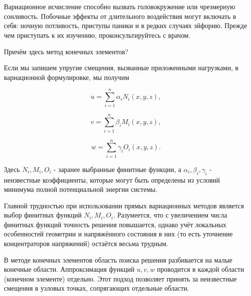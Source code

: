 \documentclass{article}
\begin{document}
\newpage
\section{}\label{appendix_d}

\begin{warn}[ВНИМАНИЕ!]
	Вариационное исчисление способно вызвать головокружение или чрезмерную сонливость. Побочные эффекты от длительного воздействия могут включать в себя: ночную потливость, приступы паники и в редких случаях эйфорию. Прежде чем приступать к их изучению, проконсультируйтесь с врачом.
\end{warn}

\begin{question}
	Причём здесь метод конечных элементов?
\end{question}

Если мы запишем упругие смещения, вызванные приложенными нагрузками, в вариационной формулировке, мы получим

\begin{displaymath}
	u = \sum_{i=1}^n  \alpha_{i} N_{i}(x, y, z),
\end{displaymath}

\begin{displaymath}
	v = \sum_{i=1}^n  \beta_{i} M_{i}(x, y, z),
\end{displaymath}

\begin{displaymath}
	w = \sum_{i=1}^n  \gamma_{i} O_{i}(x, y, z).
\end{displaymath}

\noindent Здесь $N_{i}, M_{i}, O_{i}$ - заранее выбранные финитные функции, а $\alpha_{i}, \beta_{i}, \gamma_{i}$ - неизвестные коэффициенты, которые могут быть определены из условий минимума полной потенциальной энергии системы.

Главной трудностью при использовании прямых вариационных методов является выбор финитных функций $N_{i}, M_{i}, O_{i}$. 
Разумеется, что с увеличением числа финитных функций точность решения повышается, однако учёт локальных особенностей геометрии и напряжённого состояния в них (то есть уточнение концентраторов напряжений) остаётся весьма трудным.

В методе конечных элементов область поиска решения разбивается на малые конечные области. Аппроксимация функций $u, v, w$ проводится в каждой области (конечном элементе) отдельно. Этот подход позволяет принять за неизвестные смещения в узловых точках, сопрягающих отдельные области.
\end{document}
